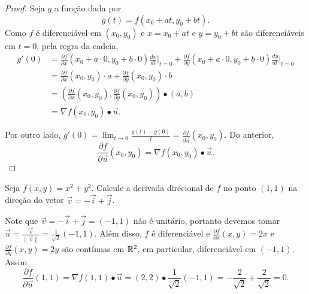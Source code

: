 \begin{proof}
    Seja \(g\) a função dada por \[g(t) = f(x_0 + at, y_0 + bt).\] Como \(f\) é diferenciável em \((x_0,y_0)\) e \(x = x_0 + at\) e \(y = y_0 + bt\) são diferenciáveis em \(t=0\), pela regra da cadeia,
        \begin{align*}
            g'(0)
                & = \frac{\partial f}{\partial x}(x_0 + a\cdot 0, y_0 + b\cdot 0)\frac{dx}{dt}\big|_{t=0} + \frac{\partial f}{\partial y}(x_0 + a\cdot 0, y_0 + b\cdot 0)\frac{dy}{dt}\big|_{t=0} \\
                & = \frac{\partial f}{\partial x}(x_0,y_0)\cdot a + \frac{\partial f}{\partial y}(x_0,y_0)\cdot b \\
                & = \left( \frac{\partial f}{\partial x}(x_0,y_0), \frac{\partial f}{\partial y}(x_0,y_0) \right)\bullet (a,b) \\
                & = \nabla f(x_0,y_0)\bullet \overrightarrow{u}.
        \end{align*}

    Por outro lado, \(g'(0) = \lim_{t\to 0} \frac{g(t) - g(0)}{t} = \frac{\partial f}{\partial \overrightarrow{u}}(x_0,y_0)\). Do anterior, \[\frac{\partial f}{\partial\overrightarrow{u}}(x_0,y_0) = \nabla f(x_0,y_0)\bullet\overrightarrow{u}.\]
\end{proof}

\begin{example}
    Seja \(f(x,y) = x^2 + y^2\). Calcule a derivada direcional de \(f\) no ponto \((1,1)\) na direção do vetor \(\overrightarrow{v} = -\overrightarrow{i} + \overrightarrow{j}\).

    Note que \(\overrightarrow{v} = -\overrightarrow{i} + \overrightarrow{j} = (-1,1)\) não é unitário, portanto devemos tomar \(\overrightarrow{u} = \frac{\overrightarrow{v}}{\|\overrightarrow{v}\|} = \frac{1}{\sqrt{2}}(-1,1)\). Além disso, \(f\) é diferenciável e \(\frac{\partial f}{\partial x}(x,y) = 2x\) e \(\frac{\partial f}{\partial y}(x,y) = 2y\) são contínuas em \(\mathbb{R}^2\), em particular, diferenciável em \((-1,1)\). Assim \[\frac{\partial f}{\partial\overrightarrow{u}}(1,1) = \nabla f(1,1)\bullet\overrightarrow{u} = (2,2)\bullet \frac{1}{\sqrt{2}}(-1,1) = -\frac{2}{\sqrt{2}} + \frac{2}{\sqrt{2}} = 0.\]
\end{example}

